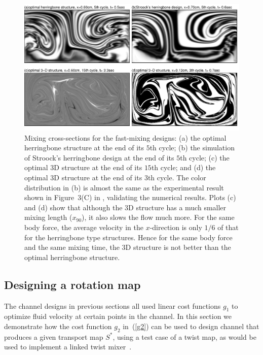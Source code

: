 \documentclass[times]{fldauth}
\begin{document}
  \begin{figure}
    \centerline{
      \includegraphics[width=1\textwidth,trim=0 20 7 5,clip=true]{example2crosscompare}
    }
    \caption{\label{example2crosscompare} Mixing cross-sections for
      the fast-mixing designs: (a) the optimal herringbone structure
      at the end of its $5$th cycle; (b) the simulation of Stroock's
      herringbone design at the end of its $5$th cycle; (c) the
      optimal 3D structure at the end of its $15$th cycle; and (d)
      the optimal 3D structure at the end of its $3$th cycle. The
      color distribution in (b) is almost the same as the experimental
      result shown in Figure~3(C) in \cite{Stroock2002}, validating
      the numerical results.  Plots (c) and (d) show that although the
      3D structure has a much smaller mixing length ($x_{90}$), it
      also slows the flow much more. For the same body force, the
      average velocity in the $x$-direction is only $1/6$ of that for
      the herringbone type structures. Hence for the same body force
      and the same mixing time, the 3D structure is not better than
      the optimal herringbone structure.}
  \end{figure}

\subsection{Designing a rotation map}
\label{sec:design-rotat-map}

The channel designs in previous sections all used linear cost
functions $g_1$ to optimize fluid velocity at certain points in the
channel. In this section we demonstrate how the cost function $g_2$
in~(\ref{g2}) can be used to design channel that produces a given
transport map $S^*$, using a test case of a twist map, as would be
used to implement a linked twist mixer~\cite{Wiggins2004}.
\end{document}
